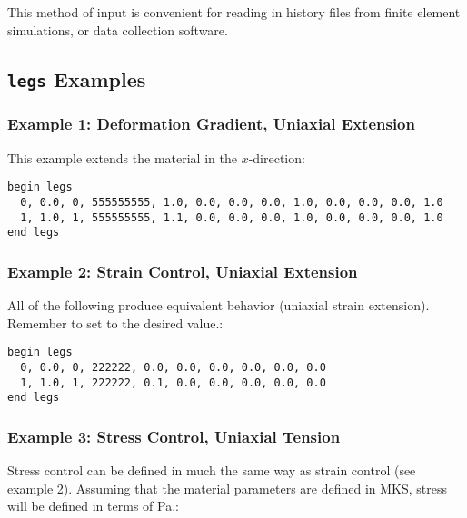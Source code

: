 \documentclass[letterpaper,10pt,english]{sphinxmanual}
\begin{document}
This method of input is convenient for reading in history files from finite
element simulations, or data collection software.


\subsection{\texttt{legs} Examples}
\label{Files/input_file_formatting:legs-examples}

\subsubsection{Example 1: Deformation Gradient, Uniaxial Extension}
\label{Files/input_file_formatting:example-1}\label{Files/input_file_formatting:example-1-deformation-gradient-uniaxial-extension}
This example extends the material in the $x$-direction:

\begin{Verbatim}[commandchars=\\\{\}]
begin legs
  0, 0.0, 0, 555555555, 1.0, 0.0, 0.0, 0.0, 1.0, 0.0, 0.0, 0.0, 1.0
  1, 1.0, 1, 555555555, 1.1, 0.0, 0.0, 0.0, 1.0, 0.0, 0.0, 0.0, 1.0
end legs
\end{Verbatim}


\subsubsection{Example 2: Strain Control, Uniaxial Extension}
\label{Files/input_file_formatting:example-2}\label{Files/input_file_formatting:example-2-strain-control-uniaxial-extension}
All of the following produce equivalent behavior (uniaxial strain extension).
Remember to set  to the desired value.:

\begin{Verbatim}[commandchars=\\\{\}]
begin legs
  0, 0.0, 0, 222222, 0.0, 0.0, 0.0, 0.0, 0.0, 0.0
  1, 1.0, 1, 222222, 0.1, 0.0, 0.0, 0.0, 0.0, 0.0
end legs
\end{Verbatim}


\subsubsection{Example 3: Stress Control, Uniaxial Tension}
\label{Files/input_file_formatting:example-3-stress-control-uniaxial-tension}\label{Files/input_file_formatting:example-3}
Stress control can be defined in much the same way as strain control (see example
2). Assuming that the material parameters are defined in MKS, stress will be
defined in terms of Pa.:
\end{document}
